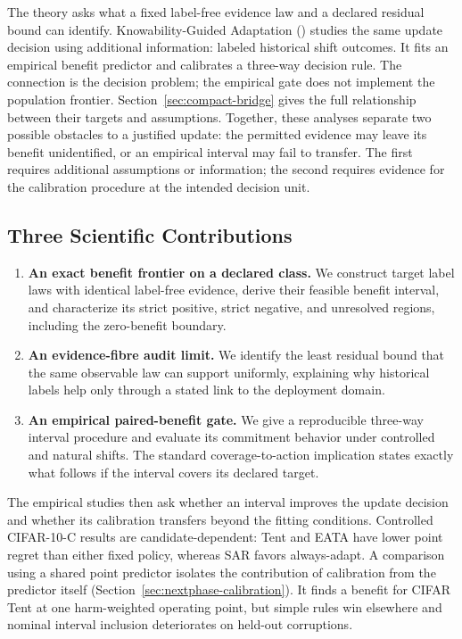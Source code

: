 The theory asks what a fixed label-free evidence law and a declared residual bound can identify.
Knowability-Guided Adaptation (\KGA) studies the same update decision using additional information:
labeled historical shift outcomes. It fits an empirical benefit predictor and calibrates a
three-way decision rule. The connection is the decision problem; the empirical gate does not
implement the population frontier. Section~\ref{sec:compact-bridge} gives the full relationship
between their targets and assumptions.
Together, these analyses separate two possible obstacles to a justified update: the permitted
evidence may leave its benefit unidentified, or an empirical interval may fail to transfer.
The first requires additional assumptions or information; the second requires evidence for
the calibration procedure at the intended decision unit.

\subsection{Three Scientific Contributions}

\begin{enumerate}
  \item \textbf{An exact benefit frontier on a declared class.}
  We construct target label laws with identical label-free evidence, derive their feasible benefit
  interval, and characterize its strict positive, strict negative, and unresolved regions,
  including the zero-benefit boundary.
  \item \textbf{An evidence-fibre audit limit.}
  We identify the least residual bound that the same observable law can support uniformly,
  explaining why historical labels help only through a stated link to the deployment domain.
  \item \textbf{An empirical paired-benefit gate.}
  We give a reproducible three-way interval procedure and evaluate its commitment behavior under
  controlled and natural shifts. The standard coverage-to-action implication states exactly what
  follows if the interval covers its declared target.
\end{enumerate}

The empirical studies then ask whether an interval improves the update decision and whether
its calibration transfers beyond the fitting conditions. Controlled CIFAR-10-C results are
candidate-dependent: Tent and EATA have lower point regret than either fixed policy, whereas
SAR favors always-adapt. A comparison using a shared point predictor isolates the contribution
of calibration from the predictor itself (Section~\ref{sec:nextphase-calibration}). It finds a
benefit for CIFAR Tent at one harm-weighted operating point, but simple rules win elsewhere
and nominal interval inclusion deteriorates on held-out corruptions.

